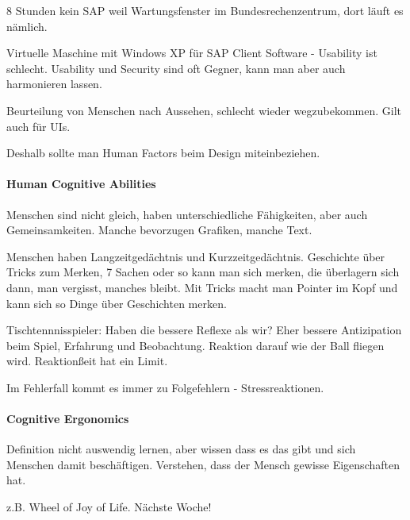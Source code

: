 8 Stunden kein SAP weil Wartungsfenster im Bundesrechenzentrum, dort läuft es
nämlich.

Virtuelle Maschine mit Windows XP für SAP Client Software - Usability ist schlecht.
Usability und Security sind oft Gegner, kann man aber auch harmonieren lassen.

Beurteilung von Menschen nach Aussehen, schlecht wieder wegzubekommen. Gilt
auch für UIs.

Deshalb sollte man Human Factors beim Design miteinbeziehen.

\paragraph{Human Cognitive Abilities}
Menschen sind nicht gleich, haben unterschiedliche Fähigkeiten, aber auch 
Gemeinsamkeiten. Manche bevorzugen Grafiken, manche Text.

Menschen haben Langzeitgedächtnis und Kurzzeitgedächtnis. 
Geschichte über Tricks zum Merken, 7 Sachen oder so kann man sich merken,
die überlagern sich dann, man vergisst, manches bleibt. Mit Tricks macht man
Pointer im Kopf und kann sich so Dinge über Geschichten merken.

Tischtennnisspieler: Haben die bessere Reflexe als wir? Eher bessere
Antizipation beim Spiel, Erfahrung und Beobachtung. Reaktion darauf wie der Ball
fliegen wird.
Reaktionßeit hat ein Limit. 

Im Fehlerfall kommt es immer zu Folgefehlern - Stressreaktionen.

\paragraph{Cognitive Ergonomics}
Definition nicht auswendig lernen, aber wissen dass es das gibt und sich
Menschen damit beschäftigen. Verstehen, dass der Mensch gewisse Eigenschaften hat.

z.B. Wheel of Joy of Life. Nächste Woche!
